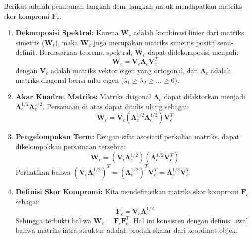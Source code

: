 \documentclass[a4paper]{article}
\theoremstyle{definition} %
\begin{document}
Berikut adalah penurunan langkah demi langkah untuk mendapatkan matriks skor kompromi $\mathbf{F}_c$:

\begin{enumerate}
    \item \textbf{Dekomposisi Spektral:} Karena $\mathbf{W}_c$ adalah kombinasi linier dari matriks simetris ($\mathbf{W}_t$), maka $\mathbf{W}_c$ juga merupakan matriks simetris positif semi-definit. Berdasarkan teorema spektral, $\mathbf{W}_c$ dapat didekomposisi menjadi:
    \begin{equation}
        \mathbf{W}_c = \mathbf{V}_c \mathbf{\Lambda}_c \mathbf{V}_c^T
    \end{equation}
    dengan $\mathbf{V}_c$ adalah matriks vektor eigen yang ortogonal, dan $\mathbf{\Lambda}_c$ adalah matriks diagonal berisi nilai eigen ($\lambda_1 \ge \lambda_2 \ge \dots \ge 0$).
    
    \item \textbf{Akar Kuadrat Matriks:} Matriks diagonal $\mathbf{\Lambda}_c$ dapat difaktorkan menjadi $\mathbf{\Lambda}_c^{1/2} \mathbf{\Lambda}_c^{1/2}$. Persamaan di atas dapat ditulis ulang sebagai:
    \begin{equation}
        \mathbf{W}_c = \mathbf{V}_c (\mathbf{\Lambda}_c^{1/2} \mathbf{\Lambda}_c^{1/2}) \mathbf{V}_c^T
    \end{equation}
    
    \item \textbf{Pengelompokan Term:} Dengan sifat asosiatif perkalian matriks, dapat dikelompokkan persamaan tersebut:
    \begin{equation}
        \mathbf{W}_c = (\mathbf{V}_c \mathbf{\Lambda}_c^{1/2}) (\mathbf{\Lambda}_c^{1/2} \mathbf{V}_c^T)
    \end{equation}
    Perhatikan bahwa $(\mathbf{V}_c \mathbf{\Lambda}_c^{1/2})^T = (\mathbf{\Lambda}_c^{1/2})^T \mathbf{V}_c^T = \mathbf{\Lambda}_c^{1/2} \mathbf{V}_c^T$.
    
    \item \textbf{Definisi Skor Kompromi:} Kita mendefinisikan matriks skor kompromi $\mathbf{F}_c$ sebagai:
    \begin{equation}
        \mathbf{F}_c = \mathbf{V}_c \mathbf{\Lambda}_c^{1/2}
    \end{equation}
    Sehingga terbukti bahwa $\mathbf{W}_c = \mathbf{F}_c \mathbf{F}_c^T$. Hal ini konsisten dengan definisi awal bahwa matriks intra-struktur adalah produk skalar dari koordinat objek.
\end{enumerate}
\end{document}

